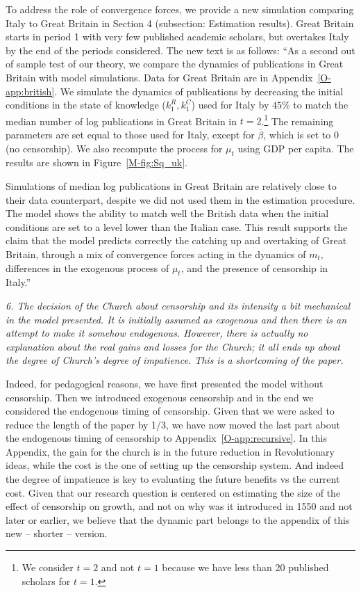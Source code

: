 \documentclass[12pt]{article}
\begin{document}
To address the role of convergence forces, we provide a new simulation comparing Italy to Great Britain in Section 4 (subsection: Estimation results). Great Britain starts in period 1 with very few published academic scholars, but overtakes Italy by the end of the periods considered. The new text is as follows: ``As a second out of sample test of our theory, we compare the dynamics of publications in Great Britain with model simulations. Data for Great Britain are in Appendix~\ref{O-app:british}. We simulate the dynamics of publications by decreasing the initial conditions in the state of knowledge ($k^R_1,k^C_1$) used for Italy by $45\%$ to match the median number of log publications in Great Britain in $t=2$.\footnote{We consider $t=2$ and not $t=1$ because we have less than 20 published scholars for $t=1$.} The remaining parameters are set equal to those used for Italy, except for $\overline{\beta}$, which is set to 0 (no censorship). We also recompute the process for $\mu_t$ using GDP per capita. The results are shown in Figure~\ref{M-fig:Sq_uk}.

Simulations of median log publications in Great Britain are relatively close to their data counterpart, despite we did not used them in the estimation procedure. The model shows the ability to match well the British data when the initial conditions are set to a level lower than the Italian case. This result supports the claim that the model predicts correctly the catching up and overtaking of Great Britain, through a mix of convergence forces acting in the dynamics of $m_t$, differences in the  exogenous process of $\mu_t$, and the presence of censorship in Italy.''

\textit{
6. The decision of the Church about censorship and its intensity a bit mechanical in the model presented. It
is initially assumed as exogenous and then there is an attempt to make it somehow endogenous. However,
there is actually no explanation about the real gains and losses for the Church; it all ends up about the degree
of Church’s degree of impatience. This is a shortcoming of the paper.
}

Indeed, for pedagogical reasons, we have first presented the model without censorship. Then we introduced exogenous censorship and in the end we considered the endogenous timing of censorship. Given that we were asked to reduce the length of the paper by 1/3, we have now moved the last part about the endogenous timing of censorship to Appendix~\ref{O-app:recursive}. In this Appendix, the gain for the church is in the future reduction in Revolutionary ideas, while the cost is the one of setting up the censorship system. And indeed the degree of impatience is key to evaluating the future benefits vs the current cost. Given that our research question is centered on estimating the size of the effect of censorship on growth, and not on why was it introduced in 1550 and not later or earlier, we believe that the dynamic part belongs to the appendix of this new -- shorter -- version.
\end{document}
